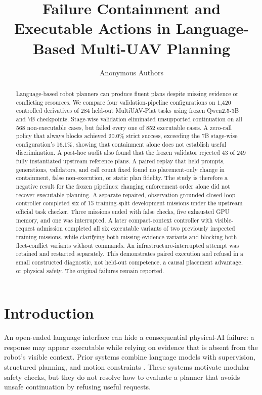 \documentclass{article}
\title{Failure Containment and Executable Actions in Language-Based Multi-UAV Planning}
\author{Anonymous Authors}
\begin{document}
\maketitle

\begin{abstract}
Language-based robot planners can produce fluent plans despite missing evidence
or conflicting resources. We compare four validation-pipeline configurations
on 1,420 controlled derivatives of 284 held-out MultiUAV-Plat tasks using frozen
Qwen2.5-3B and 7B checkpoints. Stage-wise validation eliminated unsupported
continuation on all 568 non-executable cases, but failed every one of 852
executable cases. A zero-call policy that always blocks achieved 20.0\% strict
success, exceeding the 7B stage-wise configuration's 16.1\%, showing that
containment alone does not establish useful discrimination. A post-hoc audit
also found that the frozen validator rejected 43 of 249 fully instantiated
upstream reference plans. A paired replay that held prompts, generations,
validators, and call count fixed found no placement-only change in containment,
false non-execution, or static plan fidelity. The study is therefore a negative
result for the frozen pipelines: changing enforcement order alone did not
recover executable planning. A separate repaired, observation-grounded
closed-loop controller completed six of 15 training-split development missions
under the upstream official task checker. Three missions ended with false
checks, five exhausted GPU memory, and one was interrupted.
A later compact-context controller with visible-request admission completed
all six executable variants of two previously inspected training missions,
while clarifying both missing-evidence variants and blocking both fleet-conflict
variants without commands. An infrastructure-interrupted attempt was retained
and restarted separately. This demonstrates paired execution and refusal in a
small constructed diagnostic, not held-out competence, a causal placement
advantage, or physical safety. The original failures remain reported.
\end{abstract}


\section{Introduction}

An open-ended language interface can hide a consequential physical-AI failure:
a response may appear executable while relying on evidence that is absent from
the robot's visible context. Prior systems combine language models with
supervision, structured planning, and motion constraints
\citep{tacos,roco,llamar,commandswarm}. These systems motivate modular safety
checks, but they do not resolve how to evaluate a planner that avoids unsafe
continuation by refusing useful requests.
\end{document}
